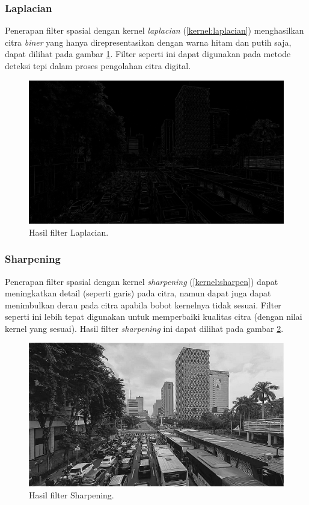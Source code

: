 \subsubsection{Laplacian}
Penerapan filter spasial dengan kernel \textit{laplacian} (\ref{kernel:laplacian}) menghasilkan citra \textit{biner} yang hanya direpresentasikan dengan warna hitam dan putih saja, dapat dilihat pada gambar \ref{fig:output-laplacian}. Filter seperti ini dapat digunakan pada metode deteksi tepi dalam proses pengolahan citra digital.
\begin{figure}
    \includegraphics[width=0.8\linewidth, center]{images/output-image/input1-laplacian.png}
    \caption{Hasil filter Laplacian.}
    \label{fig:output-laplacian}
\end{figure}

\subsubsection{Sharpening}
Penerapan filter spasial dengan kernel \textit{sharpening} (\ref{kernel:sharpen}) dapat meningkatkan detail (seperti garis) pada citra, namun dapat juga dapat menimbulkan derau pada citra apabila bobot kernelnya tidak sesuai. Filter seperti ini lebih tepat digunakan untuk memperbaiki kualitas citra (dengan nilai kernel yang sesuai). Hasil filter \textit{sharpening} ini dapat dilihat pada gambar \ref{fig:output-sharpen}.
\begin{figure}
    \includegraphics[width=0.8\linewidth, center]{images/output-image/input1-sharpen.png}
    \caption{Hasil filter Sharpening.}
    \label{fig:output-sharpen}
\end{figure}


